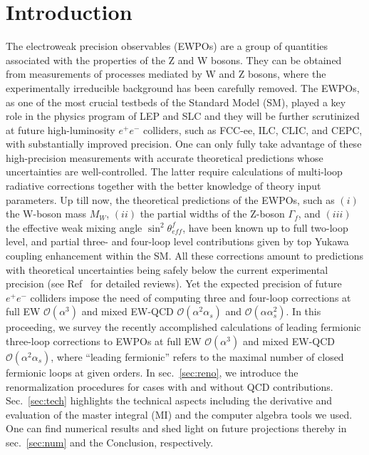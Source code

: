\documentclass[Physsubmission, Phys]{SciPost}
\begin{document}
\section{Introduction}
\label{sec:intro}
The electroweak precision observables (EWPOs) are a group of quantities associated with the properties of the Z and W bosons. They can be obtained from measurements of processes mediated by W and Z bosons, where the experimentally irreducible background has been carefully removed. The EWPOs, as one of the most crucial testbeds of the Standard Model (SM),  played a key role in the physics program of LEP and SLC and they will be further
scrutinized at future high-luminosity $e^+e^-$ colliders, such as  FCC-ee, ILC, CLIC, and CEPC, with substantially improved precision. One can only fully take advantage of these high-precision measurements with accurate theoretical predictions whose uncertainties are well-controlled. 
 The latter require calculations of multi-loop radiative corrections together with the better knowledge of theory input parameters. Up till now, the theoretical predictions of the EWPOs, such as $(i)$ the W-boson mass $M_W$, $(ii)$ the partial widths of the Z-boson $\Gamma_f$, and $(iii)$ the effective weak mixing angle $\sin^2\theta_{eff}^f$, have been known up to full two-loop level\cite{qcd2,mwshort,mwlong,mw,mwtot,swlept,swlept2,swbb,gz,zbos}, and partial three- and four-loop level contributions given by top Yukawa coupling enhancement\cite{qcd3,mt6,qcd4} within the SM. All these corrections amount to predictions with theoretical uncertainties being safely below the current experimental precision (see Ref~\cite{rev1,rev2,pdg} for detailed reviews). Yet the expected precision of future $e^+e^-$ colliders impose the need of computing three and four-loop corrections at full EW $\mathcal{O}(\alpha^3)$ and mixed EW-QCD $\mathcal{O}(\alpha^2\alpha_s)$ and $\mathcal{O}(\alpha \alpha_s^2)$. 
In this proceeding, we survey the recently accomplished calculations of leading fermionic three-loop corrections to EWPOs at full EW $\mathcal{O}(\alpha^3)$ and mixed EW-QCD $\mathcal{O}(\alpha^2\alpha_s)$, where ``leading fermionic'' refers to the maximal number of closed fermionic loops at given orders. In sec.~\ref{sec:reno}, we introduce the renormalization procedures for cases with and without QCD contributions. Sec.~\ref{sec:tech} highlights the technical aspects including the derivative and evaluation of the master integral (MI) and the computer algebra tools we used. One can find numerical results and shed light on future projections thereby in sec.~\ref{sec:num} and the Conclusion, respectively. 
\end{document}
